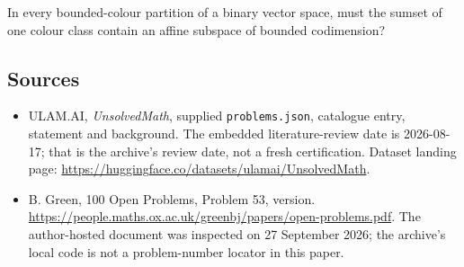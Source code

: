 \documentclass[11pt,a4paper]{article}
\begin{document}
In every bounded-colour partition of a binary vector space, must the sumset of one colour class contain an affine subspace of bounded codimension?

\subsection{Sources}

{\small

\begin{itemize}

\item[\hypertarget{source:statement:1}{S1}] ULAM.AI, \emph{UnsolvedMath}, supplied \texttt{problems.json}, catalogue entry, statement and background. The embedded literature-review date is 2026-08-17; that is the archive’s review date, not a fresh certification. Dataset landing page: \url{https://huggingface.co/datasets/ulamai/UnsolvedMath}.

\item[\hypertarget{source:statement:2}{S2}] B. Green, 100 Open Problems, Problem 53, version. \url{https://people.maths.ox.ac.uk/greenbj/papers/open-problems.pdf}. The author-hosted document was inspected on 27 September 2026; the archive’s local code is not a problem-number locator in this paper.

\end{itemize}

}

\label{end:statement}
\end{document}
